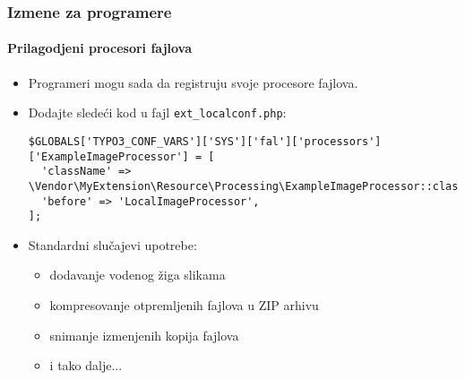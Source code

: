 \begin{frame}[fragile]
	\frametitle{Izmene za programere}
	\framesubtitle{Prilagodjeni procesori fajlova}

	\lstset{basicstyle=\tiny\ttfamily}

	\begin{itemize}
		\item Programeri mogu sada da registruju svoje procesore fajlova.
		\item Dodajte sledeći kod u fajl \texttt{ext\_localconf.php}:

\begin{lstlisting}
$GLOBALS['TYPO3_CONF_VARS']['SYS']['fal']['processors']['ExampleImageProcessor'] = [
  'className' => \Vendor\MyExtension\Resource\Processing\ExampleImageProcessor::class,
  'before' => 'LocalImageProcessor',
];
\end{lstlisting}

		\item Standardni slučajevi upotrebe:

			\begin{itemize}
				\item dodavanje vodenog žiga slikama
				\item kompresovanje otpremljenih fajlova u ZIP arhivu
				\item snimanje izmenjenih kopija fajlova
				\item i tako dalje...
			\end{itemize}

	\end{itemize}

\end{frame}


